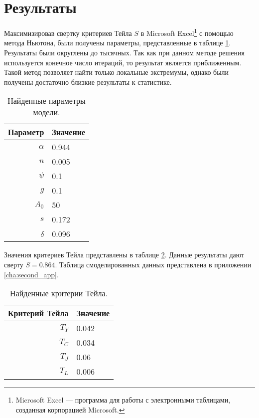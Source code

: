 \section{Результаты}

Максимизировав свертку критериев Тейла $S$ в Microsoft Excel\footnote{Microsoft Excel --- программа для работы с электронными таблицами, созданная корпорацией Microsoft.} с помощью метода Ньютона, были получены параметры, представленные в таблице \ref{tab::res_params}.
Результаты были округлены до тысячных.
Так как при данном методе решения используется конечное число итераций, то результат является приближенным.
Такой метод позволяет найти только локальные экстремумы, однако были получены достаточно близкие результаты к статистике.

\begin{table}[ht]
	\centering
	\caption{Найденные параметры модели.}
	\label{tab::res_params}
	\begin{tabular}{|r|l|}
	\hline
	Параметр & Значение         \\ \hline
	$\alpha$ &      0.944       \\
	$n$      &      0.005       \\
	$\psi$   &      0.1         \\
	$g$      &      0.1         \\
	$A_0$    &      50          \\
	$s$      &      0.172       \\
	$\delta$ &      0.096       \\ \hline
	\end{tabular}%
\end{table}

Значения критериев Тейла представлены в таблице \ref{tab::res_crit_teil}.
Данные результаты дают сверту $S=0.864$.
Таблица смоделированных данных представлена в приложении \ref{cha:second_app}.

\begin{table}[ht]
	\centering
	\caption{Найденные критерии Тейла.}
	\label{tab::res_crit_teil}
	\begin{tabular}{|r|l|}
	\hline
	Критерий Тейла & Значение         \\ \hline
	$T_{Y}$        &      0.042       \\
	$T_{C}$        &      0.034       \\
	$T_{J}$        &      0.06        \\
	$T_{L}$        &      0.006       \\ \hline
	\end{tabular}%
\end{table}

